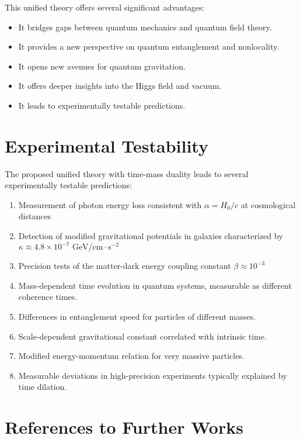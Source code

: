 \documentclass{article}
\begin{document}
	This unified theory offers several significant advantages:
	\begin{itemize}
		\item It bridges gaps between quantum mechanics and quantum field theory.
		\item It provides a new perspective on quantum entanglement and nonlocality.
		\item It opens new avenues for quantum gravitation.
		\item It offers deeper insights into the Higgs field and vacuum.
		\item It leads to experimentally testable predictions.
	\end{itemize}
	
	\section{Experimental Testability}
	
	The proposed unified theory with time-mass duality leads to several experimentally testable predictions:
	
	\begin{enumerate}
		\item Measurement of photon energy loss consistent with \(\alpha = H_0/c\) at cosmological distances
		\item Detection of modified gravitational potentials in galaxies characterized by \(\kappa \approx 4.8 \times 10^{-7} \text{ GeV/cm}\cdot\text{s}^{-2}\)
		\item Precision tests of the matter-dark energy coupling constant \(\beta \approx 10^{-3}\)
		\item Mass-dependent time evolution in quantum systems, measurable as different coherence times.
		\item Differences in entanglement speed for particles of different masses.
		\item Scale-dependent gravitational constant correlated with intrinsic time.
		\item Modified energy-momentum relation for very massive particles.
		\item Measurable deviations in high-precision experiments typically explained by time dilation.
	\end{enumerate}
	
	\section{References to Further Works}
	
\end{document}
